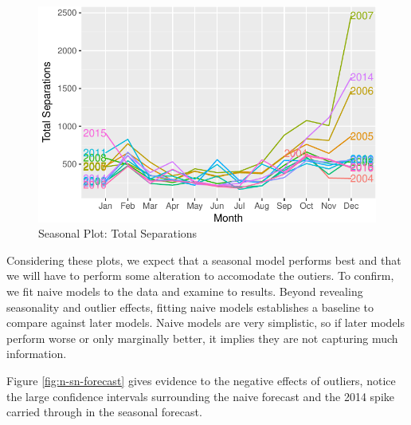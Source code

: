 \documentclass[12pt,letterpaper,toc=flat,oneside]{report}
\theoremstyle{definition}
\theoremstyle{definition}
\theoremstyle{definition}
\theoremstyle{remark}
\begin{document}
\begin{figure}[H]

{\centering \includegraphics{elliott-econometric-personnel-retention-18_files/figure-latex/response-season-plot-1} 

}

\caption{Seasonal Plot: Total Separations}\label{fig:response-season-plot}
\end{figure}

Considering these plots, we expect that a seasonal model performs best
and that we will have to perform some alteration to accomodate the
outiers. To confirm, we fit naive models to the data and examine to
results. Beyond revealing seasonality and outlier effects, fitting naive
models establishes a baseline to compare against later models. Naive
models are very simplistic, so if later models perform worse or only
marginally better, it implies they are not capturing much information.

Figure \ref{fig:n-sn-forecast} gives evidence to the negative effects of
outliers, notice the large confidence intervals surrounding the naive
forecast and the 2014 spike carried through in the seasonal forecast.
\end{document}
